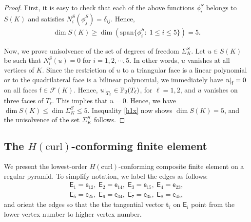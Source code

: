 \documentclass[twoside,reqno,final]{amsart}
\renewcommand{\b}[1]{{\boldsymbol{#1}}}
\def\restrict#1{\raise-0.2ex\hbox{\ensuremath|}_{#1}}
\newcommand{\FC}{\mathcal{F}}
\newcommand{\eg}{\mathsf{e}}
\newcommand{\egI}{\mathsf{E}}
\newcommand{\fc}{\mathsf{f}}
\newcommand{\pol}{\mathbb{P}}
\begin{document}
\begin{proof}
First, it is easy to check that each of the above functions $\phi_i^S$ belongs to $S(K)$ and satisfies 
$N_i^S(\phi_j^S)=\delta_{ij}$. Hence, 
\begin{align}
\label{h1x}
\dim S(K)\ge 
\dim \left(\mathrm{span}\{\phi_i^S:\;1\le i\le 5\}\right) = 5.
\end{align}



Now, we prove unisolvence of the set of degrees of freedom $\Sigma^S_K$.
Let $u\in S(K)$ be such that $N_i^S (u) = 0$ for $i= 1,2,\cdots,5$.
In other words,  $u$ vanishes at all vertices of $K$. 
Since the restriction of $u$ to a triangular face is a linear polynomial or to the quadrilateral face is a bilinear polynomial, 
we immediately have 
$u\restrict{\fc} = 0$ on all faces $\fc\in\FC(K)$. 
Hence, $u\restrict{T_\ell}\in \pol_2(T_\ell)$, for $\ell=1,2$, and $u$
vanishes on three faces of $T_\ell$.
This implies that $u=0$. Hence, we have 
$\dim S(K) \le \dim \Sigma^S_K\le 5$.
Inequality \eqref{h1x} now shows 
$\dim S(K) = 5$, and the unisolvence of the set $\Sigma^S_K$ follows.
\end{proof}



\subsection{The $H(\mathrm{curl})$-conforming finite element}
We present the lowest-order $H(\mathrm{curl})$-conforming composite finite element on 
a regular pyramid.
To simplify notation, we label the edges as follows:
\begin{align*}
\egI_{1} = \eg_{12}, \;
\egI_{2} = \eg_{14},\;
\egI_{3} = \eg_{15},\;
\egI_{4} = \eg_{23},\\
\egI_{5} = \eg_{25},\;
\egI_{6} = \eg_{34},\;
\egI_{7} = \eg_{35},\;
\egI_{8} = \eg_{45},
\end{align*}
and orient the edges so that the the tangential vector $\b t_i$ on $\egI_{i}$ point from the 
 lower vertex number to higher vertex number.
\end{document}

